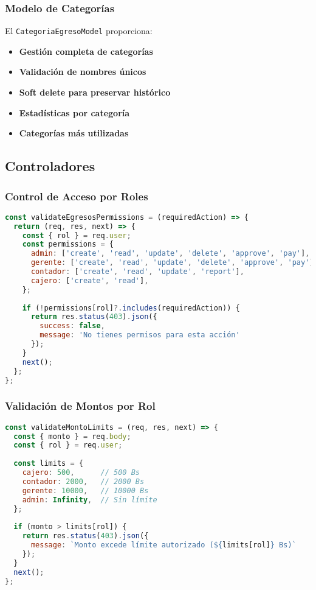 \documentclass[12pt,a4paper]{article}
\newcommand{\success}[1]{\textcolor{secondarygreen}{\textbf{#1}}}
\begin{document}
\subsubsection{Modelo de Categorías}
El \texttt{CategoriaEgresoModel} proporciona:

\begin{itemize}[leftmargin=*]
    \item \success{Gestión completa de categorías}
    \item \success{Validación de nombres únicos}
    \item \success{Soft delete para preservar histórico}
    \item \success{Estadísticas por categoría}
    \item \success{Categorías más utilizadas}
\end{itemize}

\subsection{Controladores}

\subsubsection{Control de Acceso por Roles}
\begin{lstlisting}[language=JavaScript, caption=Validación de permisos por rol]
const validateEgresosPermissions = (requiredAction) => {
  return (req, res, next) => {
    const { rol } = req.user;
    const permissions = {
      admin: ['create', 'read', 'update', 'delete', 'approve', 'pay'],
      gerente: ['create', 'read', 'update', 'delete', 'approve', 'pay'],
      contador: ['create', 'read', 'update', 'report'],
      cajero: ['create', 'read'],
    };
    
    if (!permissions[rol]?.includes(requiredAction)) {
      return res.status(403).json({
        success: false,
        message: 'No tienes permisos para esta acción'
      });
    }
    next();
  };
};
\end{lstlisting}

\subsubsection{Validación de Montos por Rol}
\begin{lstlisting}[language=JavaScript, caption=Límites de monto por rol de usuario]
const validateMontoLimits = (req, res, next) => {
  const { monto } = req.body;
  const { rol } = req.user;
  
  const limits = {
    cajero: 500,      // 500 Bs
    contador: 2000,   // 2000 Bs
    gerente: 10000,   // 10000 Bs
    admin: Infinity,  // Sin límite
  };
  
  if (monto > limits[rol]) {
    return res.status(403).json({
      message: `Monto excede límite autorizado (${limits[rol]} Bs)`
    });
  }
  next();
};
\end{lstlisting}
\end{document}
